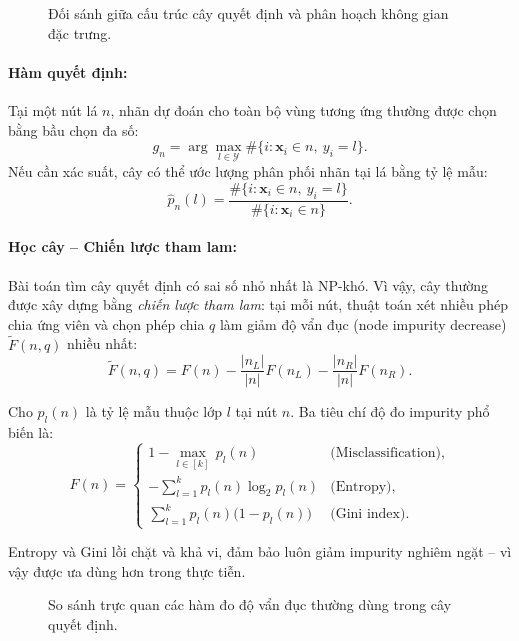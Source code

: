 \begin{figure}[H]
\centering
\resizebox{0.98\textwidth}{!}{}
\caption{Đối sánh giữa cấu trúc cây quyết định và phân hoạch không gian đặc trưng.}
\label{fig:decision-tree-partition}
\end{figure}

\paragraph{Hàm quyết định:}
Tại một nút lá $n$, nhãn dự đoán cho toàn bộ vùng tương ứng thường được chọn bằng bầu chọn đa số:
\[
  g_n=\arg\max_{l\in\mathcal{Y}}\#\{i:\bm{x}_i\in n,\ y_i=l\}.
\]
Nếu cần xác suất, cây có thể ước lượng phân phối nhãn tại lá bằng tỷ lệ mẫu:
\[
  \widehat{p}_n(l)=\frac{\#\{i:\bm{x}_i\in n,\ y_i=l\}}{\#\{i:\bm{x}_i\in n\}}.
\]

\paragraph{Học cây -- Chiến lược tham lam:}
Bài toán tìm cây quyết định có sai số nhỏ nhất là NP-khó. Vì vậy, cây thường được xây dựng bằng \textit{chiến lược tham lam}: tại mỗi nút, thuật toán xét nhiều phép chia ứng viên và chọn phép chia $q$ làm giảm độ vẩn đục (node impurity decrease) $\widetilde{F}(n,q)$ nhiều nhất:
\[
  \widetilde{F}(n,q)
  =F(n)-\frac{|n_L|}{|n|}F(n_L)-\frac{|n_R|}{|n|}F(n_R).
\]

Cho $p_l(n)$ là tỷ lệ mẫu thuộc lớp $l$ tại nút $n$. Ba tiêu chí độ đo impurity phổ biến là:
\begin{equation}
    F(n) = \begin{cases}
        1 - \max_{l\in[k]}\,p_l(n) & \text{(Misclassification)},\\[4pt]
        -\sum_{l=1}^{k} p_l(n)\log_2 p_l(n) & \text{(Entropy)},\\[4pt]
        \sum_{l=1}^{k} p_l(n)\bigl(1 - p_l(n)\bigr) & \text{(Gini index)}.
    \end{cases}
    \label{eq:impurity}
\end{equation}

Entropy và Gini lồi chặt và khả vi, đảm bảo luôn giảm impurity nghiêm ngặt -- vì vậy được ưa dùng hơn trong thực tiễn.

\begin{figure}[H]
\centering
\resizebox{0.98\textwidth}{!}{}
\caption{So sánh trực quan các hàm đo độ vẩn đục thường dùng trong cây quyết định.}
\label{fig:impurity-functions}
\end{figure}


